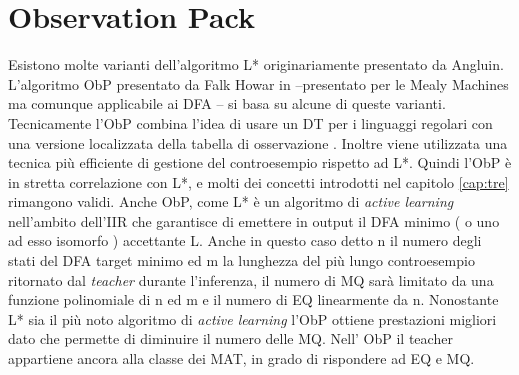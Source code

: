 
\chapter{Observation Pack} %
\label{cap:quattro}
Esistono molte varianti dell'algoritmo L* originariamente presentato da Angluin. L'algoritmo \ac{ObP} presentato da Falk Howar in \cite{Howar12} --presentato per le Mealy Machines ma comunque applicabile ai DFA -- si basa su alcune di queste varianti. Tecnicamente l'\ac{ObP} combina l'idea di usare un \ac{DT} per i linguaggi regolari \cite{Kearns94} con una versione localizzata della tabella di osservazione \cite{Schapire93}. Inoltre viene utilizzata una tecnica più efficiente di gestione del controesempio rispetto ad L*. Quindi l'\ac{ObP}  è in stretta correlazione con L*, e molti dei concetti introdotti nel capitolo \ref{cap:tre} rimangono validi. Anche \ac{ObP}, come L* è un algoritmo di \textit{active learning} nell'ambito dell'\ac{IIR} che garantisce di emettere in output il \ac{DFA} minimo ( o uno ad esso isomorfo ) accettante \ac{L}. Anche in questo caso detto n il numero degli stati del DFA target minimo ed m la lunghezza del più lungo controesempio ritornato dal \textit{teacher} durante l'inferenza, il numero di \ac{MQ} sarà limitato da una funzione polinomiale di n ed m e il numero di \ac{EQ} linearmente da n. Nonostante L* sia il più noto algoritmo di \textit{active learning} l'\ac{ObP} ottiene prestazioni migliori dato che permette di diminuire il numero delle \ac{MQ}. Nell' \ac{ObP} il teacher appartiene ancora alla classe dei \ac{MAT}, in grado di rispondere ad \ac{EQ} e \ac{MQ}.
